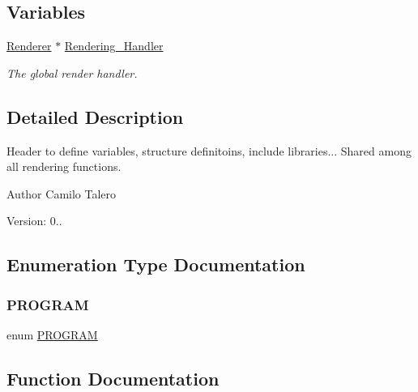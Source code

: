 \subsection*{Variables}
\begin{DoxyCompactItemize}
\item 
\mbox{\hyperlink{classRenderer}{Renderer}} $\ast$ \mbox{\hyperlink{OpenGL-Wrappers_8hpp_a21679bfe3ff6515d046879b080ac8ca9}{Rendering\+\_\+\+Handler}}
\begin{DoxyCompactList}\small\item\em The global render handler. \end{DoxyCompactList}\end{DoxyCompactItemize}


\subsection{Detailed Description}
Header to define variables, structure definitoins, include libraries... Shared among all rendering functions. 

\begin{DoxyAuthor}{Author}
Camilo Talero
\end{DoxyAuthor}
Version\+: 0.. 

\subsection{Enumeration Type Documentation}
\mbox{\label{OpenGL-Wrappers_8hpp_a567e6cb5b1eb395b3bce74667420d5ea}} 
\subsubsection{\texorpdfstring{P\+R\+O\+G\+R\+AM}{PROGRAM}}
{\footnotesize\ttfamily enum \mbox{\hyperlink{OpenGL-Wrappers_8hpp_a567e6cb5b1eb395b3bce74667420d5ea}{P\+R\+O\+G\+R\+AM}}}



\subsection{Function Documentation}
\mbox{\label{OpenGL-Wrappers_8hpp_a2008ec7e2e49a51a3d3f0091cf96bc55}} 
